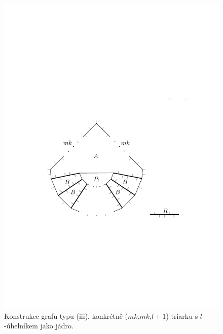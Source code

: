 \begin{figure}[h!]\centering
\includegraphics[width = \textwidth]{../img/iii-construction}
\caption{Konstrukce grafu typu (iii), konkrétně ($mk$,$mk$,$l+1$)-triarku s $l$-úhelníkem jako jádro.}
\label{obr03:konstrukceiii}
\end{figure}

